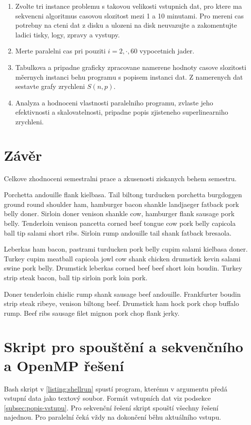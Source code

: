 \documentclass{article}
\begin{document}
    \begin{enumerate}
        \item Zvolte tri instance problemu s takovou velikosti vstupnich dat, pro ktere ma sekvencni
        algoritmus casovou slozitost mezi 1 a 10 minutami.
        Pro mereni cas potrebny na cteni dat z disku a ulozeni na disk neuvazujte a zakomentujte
        ladici tisky, logy, zpravy a vystupy.
        \item Merte paralelni cas pri pouziti $i=2,\cdot,60$ vypocetnich jader.
        \item Tabulkova a pripadne graficky zpracovane namerene hodnoty casove slozitosti měernych instanci behu programu s popisem instanci dat. Z namerenych dat sestavte grafy zrychleni $S(n,p)$.
        \item Analyza a hodnoceni vlastnosti paralelniho programu, zvlaste jeho efektivnosti a skalovatelnosti, pripadne popis zjisteneho superlinearniho zrychleni.

    \end{enumerate}


    \section{Závěr}

    Celkove zhodnoceni semestralni prace a zkusenosti ziskanych behem semestru.

    Porchetta andouille flank kielbasa. Tail biltong turducken porchetta burgdoggen ground round shoulder ham, hamburger bacon shankle landjaeger fatback pork belly doner. Sirloin doner venison shankle cow, hamburger flank sausage pork belly. Tenderloin venison pancetta corned beef tongue cow pork belly capicola ball tip salami short ribs. Sirloin rump andouille tail shank fatback bresaola.

    Leberkas ham bacon, pastrami turducken pork belly cupim salami kielbasa doner. Turkey cupim meatball capicola jowl cow shank chicken drumstick kevin salami swine pork belly. Drumstick leberkas corned beef beef short loin boudin. Turkey strip steak bacon, ball tip sirloin pork loin pork.

    Doner tenderloin chislic rump shank sausage beef andouille. Frankfurter boudin strip steak ribeye, venison biltong beef. Drumstick ham hock pork chop buffalo rump. Beef ribs sausage filet mignon pork chop flank jerky.


    \newpage
    \section{Skript pro spouštění a sekvenčního a OpenMP řešení}
    Bash skript v \ref{listing:shellrun} spustí program, kterému v argumentu předá vstupní data jako textový soubor.
    Formát vstupních dat viz podsekce \ref{subsec:popis-vstupu}. Pro sekvenční řešení skript spouští všechny řešení najednou.
    Pro paralelní čeká vždy na dokončení běhu aktuálního vstupu.
\end{document}

